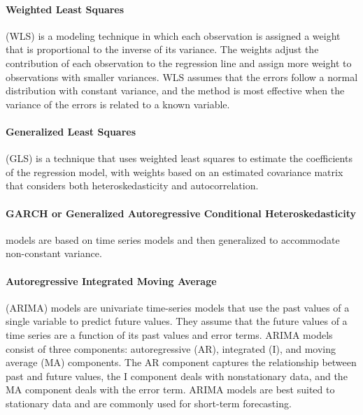 \paragraph{Weighted Least Squares} %
\label{par:weighted_least_squares}

  (WLS) is a modeling technique in which each observation is assigned a weight that is proportional to the inverse of its variance. The weights adjust the contribution of each observation to the regression line and assign more weight to observations with smaller variances. WLS assumes that the errors follow a normal distribution with constant variance, and the method is most effective when the variance of the errors is related to a known variable.


\paragraph{Generalized Least Squares} %
\label{par:generalized_least_squares}

 (GLS) is a technique that uses weighted least squares to estimate the coefficients of the regression model, with weights based on an estimated covariance matrix that considers both heteroskedasticity and autocorrelation.


\paragraph{GARCH or Generalized Autoregressive Conditional Heteroskedasticity} %
\label{par:generalized_autoregressive_conditional_heteroskedasticity}

 models are based on time series models and then generalized to accommodate non-constant variance. 


\paragraph{Autoregressive Integrated Moving Average} %
\label{par:autoregressive_integrated_moving_average}

 (ARIMA) models are uni\-variate time-series models that use the past values of a single variable to predict future values. They assume that the future values of a time series are a function of its past values and error terms. ARIMA models consist of three components: autoregressive (AR), integrated (I), and moving average (MA) components. The AR component captures the relationship between past and future values, the I component deals with nonstationary data, and the MA component deals with the error term. ARIMA models are best suited to stationary data and are commonly used for short-term forecasting.

